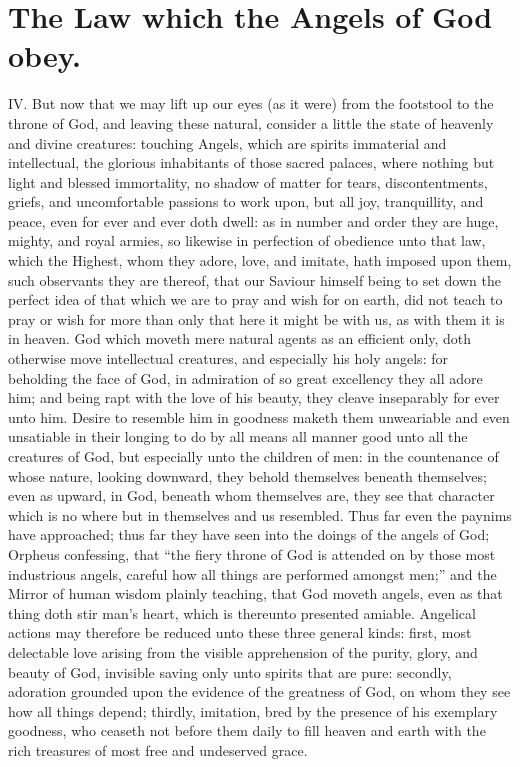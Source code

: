 \section*{The Law which the Angels of God obey.}

IV. But now that we may lift up our eyes (as it were) from the footstool to the throne of God, and leaving these natural, consider a little the state of heavenly and divine creatures: touching Angels, which are spirits immaterial and intellectual, the glorious inhabitants of those sacred palaces, where nothing but light and blessed immortality, no shadow of matter for tears, discontentments, griefs, and uncomfortable passions to work upon, but all joy, tranquillity, and peace, even for ever and ever doth dwell: as in number and order they are huge, mighty, and royal armies, so likewise in perfection of obedience unto that law, which the Highest, whom they adore, love, and imitate, hath imposed upon them, such observants they are thereof, that our Saviour himself being to set down the perfect idea of that which we are to pray and wish for on earth, did not teach to pray or wish for more than only that here it might be with us, as with them it is in heaven. God which moveth mere natural agents as an efficient only, doth otherwise move intellectual creatures, and especially his holy angels: for beholding the face of God, in admiration of so great excellency they all adore him; and being rapt with the love of his beauty, they cleave inseparably for ever unto him. Desire to resemble him in goodness maketh them unweariable and even unsatiable in their longing to do by all means all manner good unto all the creatures of God, but especially unto the children of  men: in the countenance of whose nature, looking downward, they behold themselves beneath themselves; even as upward, in God, beneath whom themselves are, they see that character which is no where but in themselves and us resembled. Thus far even the paynims have approached; thus far they have seen into the doings of the angels of God; Orpheus confessing, that “the fiery throne of God is attended on by those most industrious angels, careful how all things are performed amongst men;” and the Mirror of human wisdom plainly teaching, that God moveth angels, even as that thing doth stir man’s heart, which is thereunto presented amiable. Angelical actions may therefore be reduced unto these three general kinds: first, most delectable love arising from the visible apprehension of the purity, glory, and beauty of God, invisible saving only unto spirits that are pure: secondly, adoration grounded upon the evidence of the greatness of God, on whom they see how all things depend; thirdly, imitation, bred by the presence of his exemplary goodness, who ceaseth not before them daily to fill heaven and earth with the rich treasures of most free and undeserved grace.

